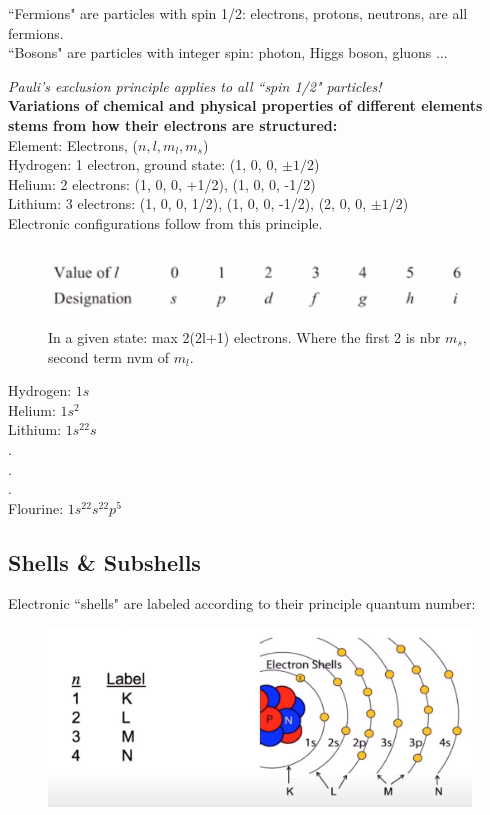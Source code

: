\documentclass[class=article,crop=false]{standalone}
\begin{document}
``Fermions" are particles with spin 1/2: electrons, protons, neutrons, are all fermions.\\
``Bosons" are particles with integer spin: photon, Higgs boson, gluons ...

\emph{Pauli's exclusion principle applies to all ``spin 1/2" particles!}\\

\textbf{Variations of chemical and physical properties of different elements stems from how their electrons are structured:}\\
Element: Electrons,  ($n, l, m_l, m_s$)\\ 
Hydrogen:   1 electron, ground state: (1, 0, 0, $\pm 1/2$) \\
Helium: 2 electrons: (1, 0, 0, +1/2), (1, 0, 0, -1/2) \\
Lithium: 3 electrons: (1, 0, 0, 1/2), (1, 0, 0, -1/2), (2, 0, 0, $\pm 1/2$) \\

Electronic configurations follow from this principle.
\begin{figure}[h!]
	\centering
	\includegraphics[width=.8\linewidth]{./Images/configurations.png}
	\caption{In a given state: max 2(2l+1) electrons. Where the first 2 is nbr $m_s$, second term nvm of $m_l$.}
\end{figure}
Hydrogen: $1s$ \\
Helium: $1s^2$ \\
Lithium: $1s^22s$ \\
. \\
. \\
. \\
Flourine: $1s^22s^22p^5$ \\

\subsection{Shells \& Subshells}
Electronic ``shells" are labeled according to their principle quantum number:

\begin{figure}[h!]
	\centering
	\includegraphics[width=.8\linewidth]{./Images/shells.png}
	\caption{}
\end{figure}
\end{document}
